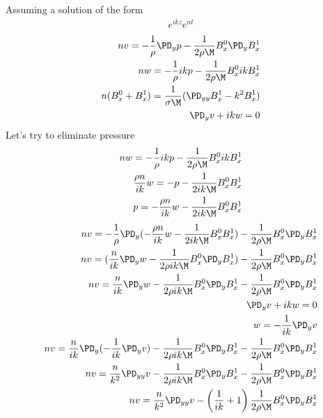 \documentclass[11pt]{article}
\begin{document}
Assuming a solution of the form
\begin{equation}\begin{aligned}
e^{ikz} e^{nt}
\end{aligned} \end{equation}
\begin{equation}\begin{aligned}
n v = -\frac{1}{\rho} \PD_y p - \frac{1}{2\rho \M} B_x^0 \PD_y B_x^1 \\
n w = -\frac{1}{\rho} ik p    - \frac{1}{2\rho \M} B_x^0 ik B_x^1 \\
n (B_x^0+B_x^1) = \frac{1}{\sigma \M} (\PD_{yy} B_x^1-k^2 B_x^1) \\
\PD_y v + ik w = 0 \\
\end{aligned} \end{equation}
Let's try to eliminate pressure
\begin{equation}\begin{aligned}
n w = -\frac{1}{\rho} ik p    - \frac{1}{2\rho \M} B_x^0 ik B_x^1 \\
\frac{\rho n}{ik} w = - p - \frac{1}{2 ik \M} B_x^0 B_x^1 \\
p = - \frac{\rho n}{ik} w - \frac{1}{2 ik \M} B_x^0 B_x^1 \\
\end{aligned} \end{equation}
\begin{equation}\begin{aligned}
n v = -\frac{1}{\rho} \PD_y (- \frac{\rho n}{ik} w - \frac{1}{2 ik \M} B_x^0 B_x^1) - \frac{1}{2\rho \M} B_x^0 \PD_y B_x^1 \\
n v = (\frac{n}{ik} \PD_y w - \frac{1}{2 \rho ik \M} B_x^0 \PD_y B_x^1) - \frac{1}{2\rho \M} B_x^0 \PD_y B_x^1 \\
n v = \frac{n}{ik} \PD_y w - \frac{1}{2 \rho ik \M} B_x^0 \PD_y B_x^1 - \frac{1}{2\rho \M} B_x^0 \PD_y B_x^1 \\
\PD_y v + ik w = 0 \\
w = -\frac{1}{ik} \PD_y v \\
n v = \frac{n}{ik} \PD_y (-\frac{1}{ik} \PD_y v) - \frac{1}{2 \rho ik \M} B_x^0 \PD_y B_x^1 - \frac{1}{2\rho \M} B_x^0 \PD_y B_x^1 \\
n v = \frac{n}{k^2} \PD_{yy} v - \frac{1}{2 \rho ik \M} B_x^0 \PD_y B_x^1 - \frac{1}{2\rho \M} B_x^0 \PD_y B_x^1 \\
n v = \frac{n}{k^2} \PD_{yy} v - \left(\frac{1}{ik} + 1 \right) \frac{1}{2 \rho \M} B_x^0 \PD_y B_x^1 \\
\end{aligned} \end{equation}
\end{document}
